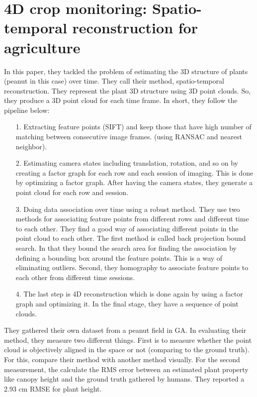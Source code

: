 \documentclass{article}
\begin{document}
\section{4D crop monitoring: Spatio-temporal reconstruction for agriculture ~\cite{dong-2017-4d}}

In this paper, they tackled the problem of estimating the 3D structure of plants (peanut in this case) over time. They call their method, spatio-temporal reconstruction. They represent the plant 3D structure using 3D point clouds. So, they produce a 3D point cloud for each time frame. In short, they follow the pipeline below:

\begin{itemize}
\item[1.] Extracting feature points (SIFT) and keep those that have high number of matching between consecutive image frames. (using RANSAC and nearest neighbor).
\item[2.] Estimating camera states including translation, rotation, and so on by creating a factor graph for each row and each session of imaging. This is done by optimizing a factor graph. After having the camera states, they generate a point cloud for each row and session. 
\item[3.] Doing data association over time using a robust method. They use two methods for associating feature points from different rows and different time to each other. They find a good way of associating different points in the point cloud to each other. The first method is called back projection bound search. In that they bound the search area for finding the association by defining a bounding box around the feature points. This is a way of eliminating outliers. Second, they homography to associate feature points to each other from different time sessions. 
\item[4.] The last step is 4D reconstruction which is done again by using a factor graph and optimizing it. In the final stage, they have a sequence of point clouds. 
\end{itemize}

They gathered their own dataset from a peanut field in GA. In evaluating their method, they measure two different things. First is to measure whether the point cloud is objectively aligned in the space or not (comparing to the ground truth). For this, compare their method with another method visually. For the second measurement, the calculate the RMS error between an estimated plant property like canopy height and the ground truth gathered by humans. They reported a 2.93 cm RMSE for plant height. 
\end{document}
